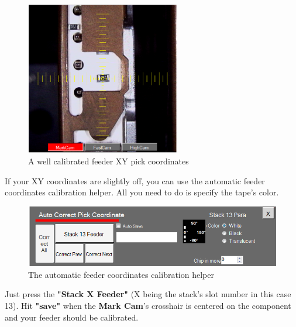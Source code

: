 \documentclass[a4paper,10pt]{report}
\begin{document}
 \begin{figure}[!htb]
 \centering
 \includegraphics[width=0.6\textwidth]{scrot22.png}
 \caption{A well calibrated feeder XY pick coordinates}
\end{figure}
If your XY coordinates are slightly off, you can use the automatic feeder coordinates calibration helper. All you need to do is specify the tape's color.\\

 \begin{figure}[!htb]
 \centering
 \includegraphics[width=1\textwidth]{scrot23.png}
 \caption{The automatic feeder coordinates calibration helper}
\end{figure}
Just press the \textbf{"Stack X Feeder"} (X being the stack's slot number in this case 13). Hit \textbf{"save"} when the \textbf{Mark Cam}'s crosshair is centered on the component and your feeder should be calibrated.
\newpage
\end{document}

